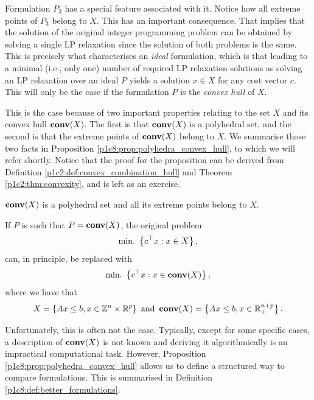 Formulation $P_3$ has a special feature associated with it. Notice how all extreme points of $P_3$ belong to $X$. This has an important consequence. That implies that the solution of the original integer programming problem can be obtained by solving a single LP relaxation since the solution of both problems is the same. This is precisely what characterises an \emph{ideal} formulation, which is that leading to a minimal (i.e., only one) number of required LP relaxation solutions as solving an LP relaxation over an ideal $P$ yields a solution $x \in X$ for any cost vector $c$. This will only be the case if the formulation $P$ is the \emph{convex hull} of $X$.

This is the case because of two important properties relating to the set $X$ and its convex hull $\mathop{\bf conv}(X)$. The first is that $\mathop{\bf conv}(X)$ is a polyhedral set, and the second is that the extreme points of $\mathop{\bf conv}(X)$ belong to $X$. We summarise those two facts in Proposition \ref{p1c8:prop:polyhedra_convex_hull}, to which we will refer shortly. Notice that the proof for the proposition can be derived from Definition \ref{p1c2:def:convex_combination_hull} and Theorem \ref{p1c2:thm:convexity}, and is left as an exercise.
  
\begin{proposition}\label{p1c8:prop:polyhedra_convex_hull}
	$\mathop{\bf conv}(X)$ is a polyhedral set and all its extreme points belong to $X$. 
\end{proposition}

 
If $P$ is such that $P = \mathop{\bf conv} (X)$, the original problem 
%
\begin{equation*}
	\mathop{\text{min.~}}\left\{ c^\top x : x \in X \right \},
\end{equation*}
%
can, in principle, be replaced with 
%
\begin{equation*}
	\mathop{\text{min.~}}\left\{  c^\top x : x \in \mathop{\bf conv}(X) \right \},	
\end{equation*}
%
where we have that 
%
\begin{equation*}
	X = \left\{ Ax \leq b, x \in \mathbb{Z}^n \times \mathbb{R}^p \right \} \text{ and } \mathop{\bf conv}(X) = \left\{ Ax \leq b, x \in \mathbb{R}_+^{n+p} \right \}.	
\end{equation*}

Unfortunately, this is often not the case. Typically, except for some specific cases, a description of $\mathop{\bf conv}(X)$ is not known and deriving it algorithmically is an impractical computational task. However, Proposition \ref{p1c8:prop:polyhedra_convex_hull} allows us to define a structured way to compare formulations. This is summarised in Definition \ref{p1c8:def:better_formulations}.

